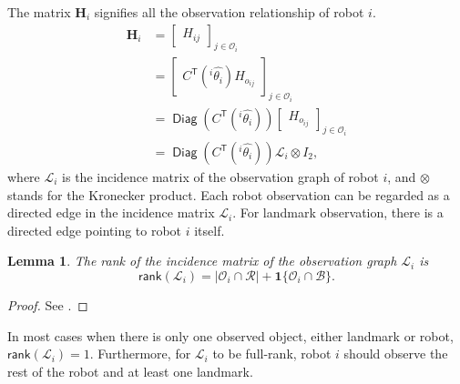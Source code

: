 \documentclass[xcolor=x11names]{article}
\DeclareMathOperator\Diag{\mathsf{Diag}}
\DeclareMathOperator\T{\mathsf{T}}
\newtheorem{lemma}{Lemma}
\begin{document}
   
The matrix $\mathbf{H}_{i}$ signifies all the observation relationship of robot $i$.
   \begin{align*}
      \mathbf{H}_{i} &= \begin{bmatrix}H_{ij}\end{bmatrix}_{j\in \mathcal{O}_i } \\
         &= \begin{bmatrix} C^{\T}({}^i\hat{\theta_i}) H_{o_{ij}}\end{bmatrix}_{j\in \mathcal{O}_i } \\
         &= \Diag\left( C^{\T}({}^i\hat{\theta_i}) \right)\begin{bmatrix} H_{o_{ij}}\end{bmatrix}_{j\in \mathcal{O}_i } \\
         &= \Diag\left( C^{\T}({}^i\hat{\theta_i}) \right) \mathcal{L}_i \otimes I_2,
   \end{align*}
where $\mathcal{L}_i$ is the incidence matrix of the observation graph of robot $i$, and $\otimes$ stands for the Kronecker product. Each robot observation can be regarded as a directed edge in the incidence matrix $\mathcal{L}_i$. For landmark observation, there is a directed edge pointing to robot $i$ itself. 












\begin{lemma}
   The rank of the incidence matrix of the observation graph $\mathcal{L}_i$ is 
   \begin{equation}
      \mathsf{rank}\left( \mathcal{L}_i  \right) = |\mathcal{O}_i \cap \mathcal{R}| + \mathbf{1}\{\mathcal{O}_i \cap \mathcal{B}\}.
   \end{equation}
\end{lemma}
\begin{proof}
   See \cite[p. 18]{bapat_graphs_2010}.
\end{proof}

In most cases when there is only one observed object, either landmark or robot, $\mathsf{rank}( \mathcal{L}_i)=1 $. Furthermore, for $\mathcal{L}_i$ to be full-rank, robot $i$ should observe the rest of the robot and at least one landmark.
\end{document}
